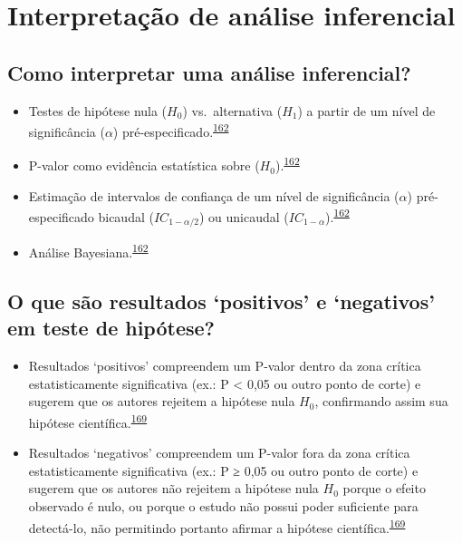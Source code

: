 \documentclass[
  a4paper,
]{book}
\begin{document}
\hypertarget{interpretauxe7uxe3o-de-anuxe1lise-inferencial}{%
\section{Interpretação de análise inferencial}\label{interpretauxe7uxe3o-de-anuxe1lise-inferencial}}

\hypertarget{como-interpretar-uma-anuxe1lise-inferencial}{%
\subsection{Como interpretar uma análise inferencial?}\label{como-interpretar-uma-anuxe1lise-inferencial}}

\begin{itemize}
\item
  Testes de hipótese nula (\(H_{0}\)) vs.~alternativa (\(H_{1}\)) a partir de um nível de significância (\(\alpha\)) pré-especificado.\textsuperscript{\protect\hyperlink{ref-goodman2016}{162}}
\item
  P-valor como evidência estatística sobre (\(H_{0}\)).\textsuperscript{\protect\hyperlink{ref-goodman2016}{162}}
\item
  Estimação de intervalos de confiança de um nível de significância (\(\alpha\)) pré-especificado bicaudal (\(IC_{1-\alpha/2}\)) ou unicaudal (\(IC_{1-\alpha}\)).\textsuperscript{\protect\hyperlink{ref-goodman2016}{162}}
\item
  Análise Bayesiana.\textsuperscript{\protect\hyperlink{ref-goodman2016}{162}}
\end{itemize}

\hypertarget{o-que-suxe3o-resultados-positivos-e-negativos-em-teste-de-hipuxf3tese}{%
\subsection{O que são resultados `positivos' e `negativos' em teste de hipótese?}\label{o-que-suxe3o-resultados-positivos-e-negativos-em-teste-de-hipuxf3tese}}

\begin{itemize}
\item
  Resultados `positivos' compreendem um P-valor dentro da zona crítica estatisticamente significativa (ex.: P \textless{} 0,05 ou outro ponto de corte) e sugerem que os autores rejeitem a hipótese nula \(H_{0}\), confirmando assim sua hipótese científica.\textsuperscript{\protect\hyperlink{ref-greenhalgh1997a}{169}}
\item
  Resultados `negativos' compreendem um P-valor fora da zona crítica estatisticamente significativa (ex.: P ≥ 0,05 ou outro ponto de corte) e sugerem que os autores não rejeitem a hipótese nula \(H_{0}\) porque o efeito observado é nulo, ou porque o estudo não possui poder suficiente para detectá-lo, não permitindo portanto afirmar a hipótese científica.\textsuperscript{\protect\hyperlink{ref-greenhalgh1997a}{169}}
\end{itemize}
\end{document}
